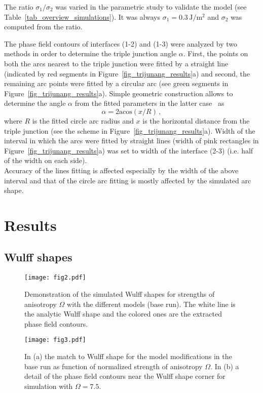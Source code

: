 The ratio $\sigma_1/\sigma_2$ was varied in the parametric study to validate the model (see Table~\ref{tab_overview_simulations}). It was always $\sigma_1=0.3\,\mathrm{J/m^2}$ and $\sigma_2$ was computed from the ratio.

The phase field contours of interfaces (1-2) and (1-3) were analyzed by two methods in order to determine the triple junction angle $\alpha$. First, the points on both the arcs nearest to the triple junction were fitted by a straight line (indicated by red segments in Figure~\ref{fig_trijunang_results}a) and second, the remaining arc points were fitted by a circular arc (see green segments in Figure~\ref{fig_trijunang_results}a). Simple geometric construction allows to determine the angle $\alpha$ from the fitted parameters in the latter case~\cite{Moelans2009} as
\begin{equation}
	\alpha = 2\mathrm{acos}(x/R)\,,
\end{equation}
where $R$ is the fitted circle arc radius and $x$ is the horizontal distance from the triple junction (see the scheme in Figure~\ref{fig_trijunang_results}a). Width of the interval in which the arcs were fitted by straight lines (width of pink rectangles in Figure~\ref{fig_trijunang_results}a) was set to width of the interface (2-3) (i.e. half of the width on each side).\\
Accuracy of the lines fitting is affected especially by the width of the above interval and that of the circle arc fitting is mostly affected by the simulated arc shape.

\section{Results}
\label{sec_Results}

\subsection{Wulff shapes}
\begin{figure}
	\centering
	\texttt{[image: fig2.pdf]}
	\caption{Demonstration of the simulated Wulff shapes for strengths of anisotropy $\Omega$ with the different models (base run). The white line is the analytic Wulff shape and the colored ones are the extracted phase field contours.}
	\label{fig_wulff_demo_shapes}
\end{figure}

\begin{figure}[]
	\centering
	\texttt{[image: fig3.pdf]}
	\caption{In (a) the match to Wulff shape for the model modifications in the base run as function of normalized strength of anisotropy $\Omega$. In (b) a detail of the phase field contours near  the Wulff shape corner for simulation with $\Omega=7.5$.}
	\label{fig_wulff_match}
\end{figure}

